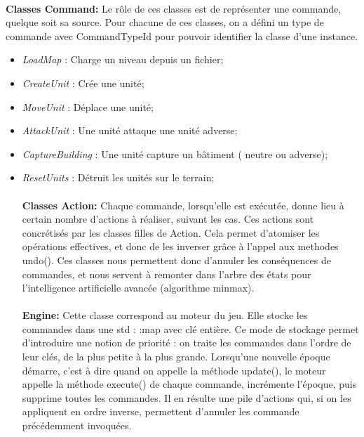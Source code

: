 \documentclass[12pt]{report}
\begin{document}
\paragraph{}\textbf{Classes Command:} Le rôle de ces classes est de représenter une commande, quelque soit sa source. Pour chacune de ces classes, on a défini un type de commande avec CommandTypeId pour pouvoir identifier la classe d'une instance.
\begin{itemize}
    \item \emph{LoadMap} : Charge un niveau depuis un fichier;
    \item \emph{CreateUnit} : Crée une unité;
    \item \emph{MoveUnit} : Déplace une unité;
    \item \emph{AttackUnit} : Une unité attaque une unité adverse;
    \item \emph{CaptureBuilding} : Une unité capture un bâtiment ( neutre ou adverse);
    \item \emph{ResetUnits} : Détruit les unités sur le terrain;
    
\paragraph{}\textbf{Classes Action:}  Chaque commande, lorsqu’elle est exécutée, donne lieu à certain nombre d’actions à réaliser, suivant les cas. Ces actions sont concrétisés par les classes ﬁlles de Action. Cela permet d’atomiser les opérations effectives, et donc de les inverser grâce à l’appel aux methodes undo(). Ces classes nous permettent donc d’annuler les conséquences de commandes, et nous servent à remonter dans l’arbre des états pour l’intelligence artiﬁcielle avancée (algorithme minmax). 

\paragraph{}\textbf{Engine:} Cette classe correspond au moteur du jeu. Elle stocke les commandes dans une std : :map avec clé entière. Ce mode de stockage permet d’introduire une notion de priorité : on traite les commandes dans l’ordre de leur clés, de la plus petite à la plus grande. Lorsqu’une nouvelle époque démarre, c'est à dire quand on appelle la méthode update(), le moteur appelle la méthode execute() de chaque commande, incrémente l’époque, puis supprime toutes les commandes. Il en résulte une pile d’actions qui, si on les appliquent en ordre inverse, permettent d’annuler les commande précédemment invoquées.



\end{itemize}
\end{document}
